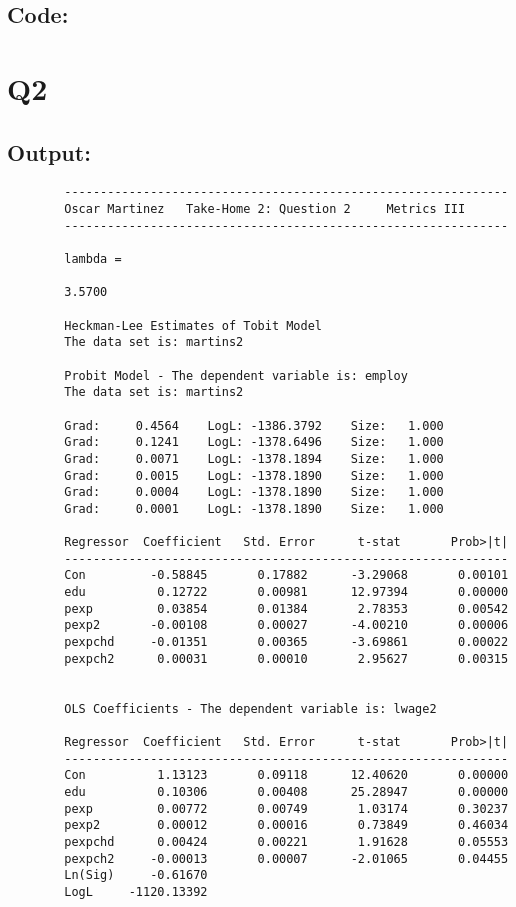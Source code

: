 \documentclass[12pt]{article}
\begin{document}
		\subsection*{Code:}
	
	
	\section*{Q2}
	\subsection*{Output:}
	\begin{verbatim}
		--------------------------------------------------------------
		Oscar Martinez 	 Take-Home 2: Question 2 	 Metrics III
		--------------------------------------------------------------
		
		lambda =
		
		3.5700
		
		Heckman-Lee Estimates of Tobit Model
		The data set is: martins2
		
		Probit Model - The dependent variable is: employ
		The data set is: martins2
		
		Grad:     0.4564    LogL: -1386.3792    Size:   1.000
		Grad:     0.1241    LogL: -1378.6496    Size:   1.000
		Grad:     0.0071    LogL: -1378.1894    Size:   1.000
		Grad:     0.0015    LogL: -1378.1890    Size:   1.000
		Grad:     0.0004    LogL: -1378.1890    Size:   1.000
		Grad:     0.0001    LogL: -1378.1890    Size:   1.000
		
		Regressor  Coefficient	 Std. Error 	 t-stat       Prob>|t|
		--------------------------------------------------------------
		Con         -0.58845       0.17882      -3.29068       0.00101 
		edu          0.12722       0.00981      12.97394       0.00000 
		pexp         0.03854       0.01384       2.78353       0.00542 
		pexp2       -0.00108       0.00027      -4.00210       0.00006 
		pexpchd     -0.01351       0.00365      -3.69861       0.00022 
		pexpch2      0.00031       0.00010       2.95627       0.00315 
		
		
		OLS Coefficients - The dependent variable is: lwage2
		
		Regressor  Coefficient	 Std. Error 	 t-stat       Prob>|t|
		--------------------------------------------------------------
		Con          1.13123       0.09118      12.40620       0.00000 
		edu          0.10306       0.00408      25.28947       0.00000 
		pexp         0.00772       0.00749       1.03174       0.30237 
		pexp2        0.00012       0.00016       0.73849       0.46034 
		pexpchd      0.00424       0.00221       1.91628       0.05553 
		pexpch2     -0.00013       0.00007      -2.01065       0.04455 
		Ln(Sig)     -0.61670
		LogL     -1120.13392
		

\end{verbatim}
\end{document}
